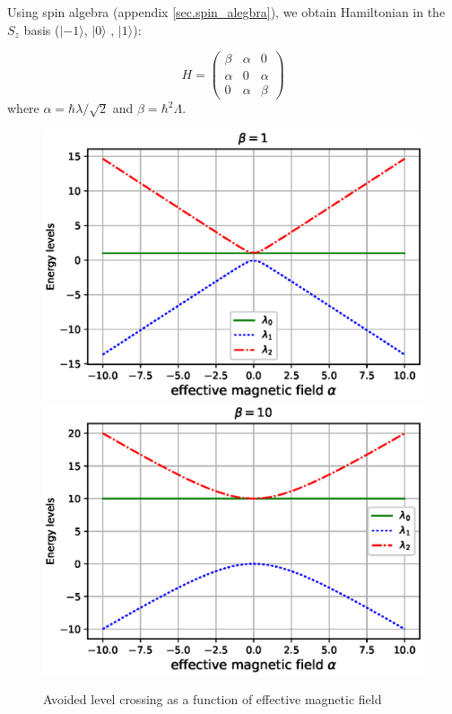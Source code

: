 \documentclass[11pt,a4paper]{article}
\begin{document}
Using spin algebra  (appendix \ref{sec.spin_alegbra}), we obtain Hamiltonian in the $S_z$ basis ($|- 1\rangle$, $| 0 \rangle$ , $| 1 \rangle$):

\begin{equation}
H= \begin{pmatrix}
    \beta       & \alpha  & 0  \\
    \alpha       & 0 &\alpha  \\
     0       & \alpha & \beta
\end{pmatrix}
\end{equation}
where $\alpha= \hbar \lambda/ \sqrt{2} $ and $\beta= \hbar^2 \Lambda$.


\begin{figure}[!ht]
\begin{center}
\includegraphics[scale=0.5]{pics/energy_level_beta1.eps} 
\includegraphics[scale=0.5]{pics/energy_level_beta10.eps} 
\caption{Avoided level crossing as a function of effective magnetic field }
\label{ev}
\end{center}
\end{figure}
\end{document}
